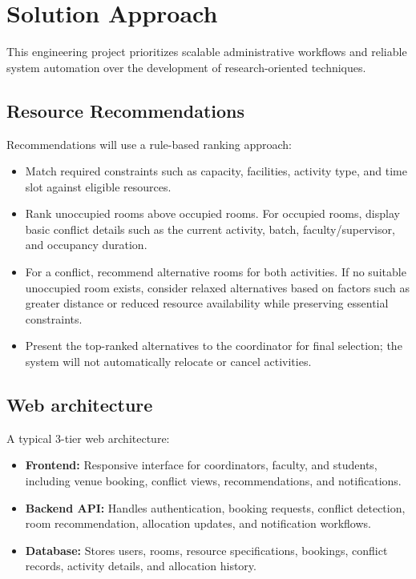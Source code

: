 \documentclass[11pt,a4paper]{article}
\begin{document}
\section{Solution Approach }
This engineering project prioritizes scalable administrative workflows and reliable system automation over the development of research-oriented techniques.

\subsection{Resource Recommendations }
Recommendations will use a rule-based ranking approach:
\begin{itemize}[leftmargin=0.7cm]
    \item Match required constraints such as capacity, facilities, activity type, and time slot against eligible resources.
    \item Rank unoccupied rooms above occupied rooms. For occupied rooms, display basic conflict details such as the current activity, batch, faculty/supervisor, and occupancy duration.
    \item For a conflict, recommend alternative rooms for both activities. If no suitable unoccupied room exists, consider relaxed alternatives based on factors such as greater distance or reduced resource availability while preserving essential constraints.
    \item Present the top-ranked alternatives to the coordinator for final selection; the system will not automatically relocate or cancel activities.
\end{itemize}

\subsection{Web architecture }
A typical 3-tier web architecture:
\begin{itemize}[leftmargin=0.7cm]
    \item \textbf{Frontend:} Responsive interface for coordinators, faculty, and students, including venue booking, conflict views, recommendations, and notifications.
    \item \textbf{Backend API:} Handles authentication, booking requests, conflict detection, room recommendation, allocation updates, and notification workflows.
    \item \textbf{Database:} Stores users, rooms, resource specifications, bookings, conflict records, activity details, and allocation history.
\end{itemize}
\end{document}
